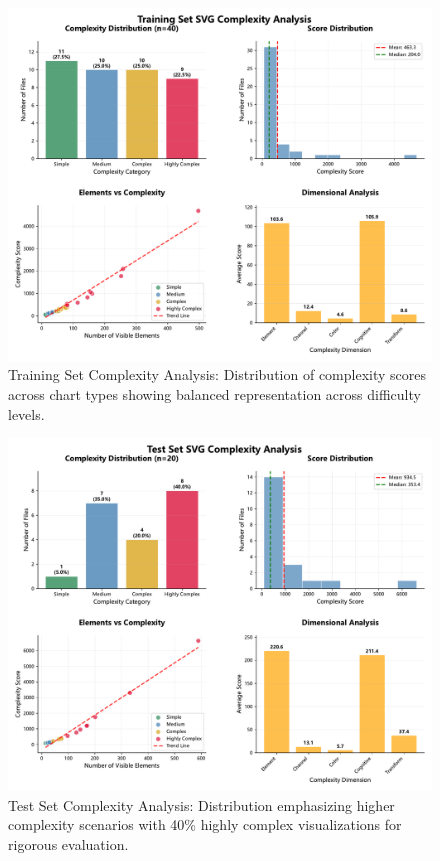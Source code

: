 \documentclass[journal]{IEEEtran}
\begin{document}
\begin{figure}[!htb]
\centering
\includegraphics[width=\columnwidth]{training_set_complexity_analysis.pdf}
\caption{Training Set Complexity Analysis: Distribution of complexity scores across chart types showing balanced representation across difficulty levels.}
\label{fig:training_complexity}
\end{figure}

\begin{figure}[!htb]
\centering
\includegraphics[width=\columnwidth]{test_set_complexity_analysis.pdf}
\caption{Test Set Complexity Analysis: Distribution emphasizing higher complexity scenarios with 40\% highly complex visualizations for rigorous evaluation.}
\label{fig:test_complexity}
\end{figure}
\end{document}
